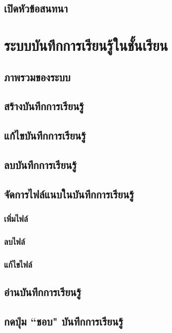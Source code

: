\documentclass[12pt,oneside]{book}
\begin{document}
\section{เปิดหัวข้อสนทนา}

\chapter{ระบบบันทึกการเรียนรู้ในชั้นเรียน}

\section{ภาพรวมของระบบ}

\section{สร้างบันทึกการเรียนรู้}

\section{แก้ไขบันทึกการเรียนรู้}

\section{ลบบันทึกการเรียนรู้}

\section{จัดการไฟล์แนบในบันทึกการเรียนรู้}

\subsection{เพิ่มไฟล์}

\subsection{ลบไฟล์}

\subsection{แก้ไขไฟล์}

\section{อ่านบันทึกการเรียนรู้}

\section{กดปุ่ม ``ชอบ" บันทึกการเรียนรู้}
\end{document}

